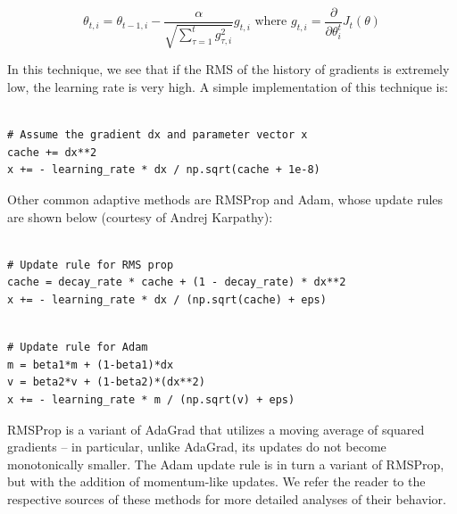 \documentclass{tufte-handout}
\begin{document}
$$\theta_{t,i} = \theta_{t-1,i}  - \frac{\alpha}{\sqrt{\sum_{\tau=1}^{t} g_{\tau , i}^2}} g_{t,i} \text{ where } g_{t,i} = \frac{\partial}{\partial \theta_i^t}J_t(\theta) $$

In this technique, we see that if the RMS of the history of gradients is extremely low, the learning rate is very high. A simple implementation of this technique is:
\begin{theorem}
\begin{verbatim}

# Assume the gradient dx and parameter vector x
cache += dx**2
x += - learning_rate * dx / np.sqrt(cache + 1e-8)
\end{verbatim}
\label{snip:adagrad}
\end{theorem}
Other common adaptive methods are RMSProp and Adam, whose update rules are shown below (courtesy of Andrej Karpathy):

\begin{theorem}
\begin{verbatim}

# Update rule for RMS prop
cache = decay_rate * cache + (1 - decay_rate) * dx**2
x += - learning_rate * dx / (np.sqrt(cache) + eps)
\end{verbatim}
\label{snip:rmsprop}
\end{theorem}

\begin{theorem}
\begin{verbatim}

# Update rule for Adam
m = beta1*m + (1-beta1)*dx
v = beta2*v + (1-beta2)*(dx**2)
x += - learning_rate * m / (np.sqrt(v) + eps)
\end{verbatim}
\label{snip:adam}
\end{theorem}
RMSProp is a variant of AdaGrad that utilizes a moving average of squared gradients -- in particular, unlike AdaGrad, its updates do not become monotonically smaller. The Adam update rule is in turn a variant of RMSProp, but with the addition of momentum-like updates. We refer the reader to the respective sources of these methods for more detailed analyses of their behavior.
\end{document}
